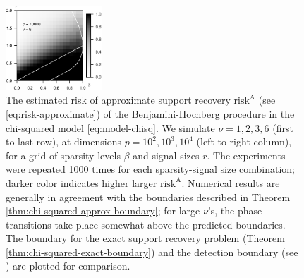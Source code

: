 \begin{figure}
      \includegraphics[width=0.32\textwidth]{sim_weak_boundary/simulated_weak_boundary_chi-squared_nu6_p10000.eps}
      \caption{The estimated risk of approximate support recovery $\mathrm{risk}^{\mathrm{A}}$ (see \eqref{eq:risk-approximate}) of the Benjamini-Hochberg procedure in the chi-squared model \eqref{eq:model-chisq}. 
      We simulate $\nu=1, 2, 3, 6$ (first to last row), at dimensions $p=10^2, 10^3, 10^4$ (left to right column), for a grid of sparsity levels $\beta$ and signal sizes $r$.
      The experiments were repeated 1000 times for each sparsity-signal size combination; darker color indicates higher larger $\mathrm{risk}^{\mathrm{A}}$. 
      Numerical results are generally in agreement with the boundaries described in Theorem \ref{thm:chi-squared-approx-boundary}; for large $\nu$'s, the phase transitions take place somewhat above the predicted boundaries.
      The boundary for the exact support recovery problem (Theorem \ref{thm:chi-squared-exact-boundary}) and the detection boundary (see \citep{donoho2004higher}) are plotted for comparison.} 
      \label{fig:phase-simulated-chi-squared-approx-boundary}
\end{figure}


